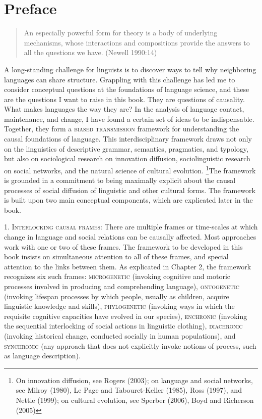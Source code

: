 \chapter{Preface}


\begin{quotation}
An especially powerful form for theory is a body of underlying 
mechanisms, whose interactions and compositions provide the answers to 
all the questions we have. (Newell 1990:14)
\end{quotation}

A long-standing challenge for linguists is to discover ways to tell why neighboring languages can share structure. Grappling with this challenge has led me to consider conceptual questions at the foundations of language science, and these are the questions I want to raise in this book. They are questions of causality. What makes languages the way they are? In the analysis of language contact, maintenance, and change, I have found a certain set of ideas to be indispensable. Together, they form a \textsc{biased transmission} framework for understanding the causal foundations of language. This interdisciplinary framework draws not only on the linguistics of descriptive grammar, semantics, pragmatics, and typology, but also on sociological research on innovation diffusion, sociolinguistic research on social networks, and the natural science of cultural evolution. \footnote{On innovation diffusion, see Rogers (2003); on language and social networks, see Milroy (1980), Le Page and Tabouret-Keller (1985), Ross (1997), and Nettle (1999); on cultural evolution, see Sperber (2006), Boyd and Richerson (2005)}The framework is grounded in a commitment to being maximally explicit about the causal processes of social diffusion of linguistic and other cultural forms. The framework is built upon two main conceptual components, which are explicated later in the book.

1. \textsc{Interlocking causal frames}: There are multiple frames or time-scales at which  change in language and social relations can be causally affected. Most approaches work with one or two of these frames. The framework to be developed in this book insists on simultaneous attention to all of these frames, and special attention to the links between them. As explicated in Chapter 2, the framework recognizes six such frames: \textsc{microgenetic} (invoking cognitive and motoric processes involved in producing and comprehending language), \textsc{ontogenetic} (invoking lifespan processes by which people, usually as children, acquire linguistic knowledge and skills), \textsc{phylogenetic} (invoking ways in which the requisite cognitive capacities have evolved in our species), \textsc{enchronic} (invoking the sequential interlocking of social actions in linguistic clothing), \textsc{diachronic} (invoking historical change, conducted socially in human populations), and \textsc{synchronic} (any approach that does not explicitly invoke notions of process, such as language description).


